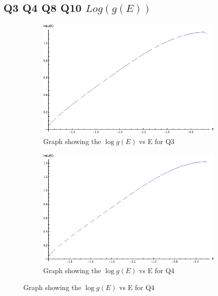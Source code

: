 \subsection{Q3 Q4 Q8 Q10 $Log(g(E))$}
\label{subsec:QLogg}
\begin{figure}[H]
\centering
\begin{subfigure}[b]{0.45\textwidth}
    \includegraphics[width=\textwidth]{7-Appendices/Q3Log(rho(E)).png}
    \caption{Graph showing the $\log{g\left(E\right)}$ vs E for Q3}
\end{subfigure}
\begin{subfigure}[b]{0.45\textwidth}
    \includegraphics[width=\textwidth]{7-Appendices/Q4Log(rho(E)).png}
    \caption{Graph showing the $\log{g\left(E\right)}$ vs E for Q4}
\end{subfigure}


\end{figure}
